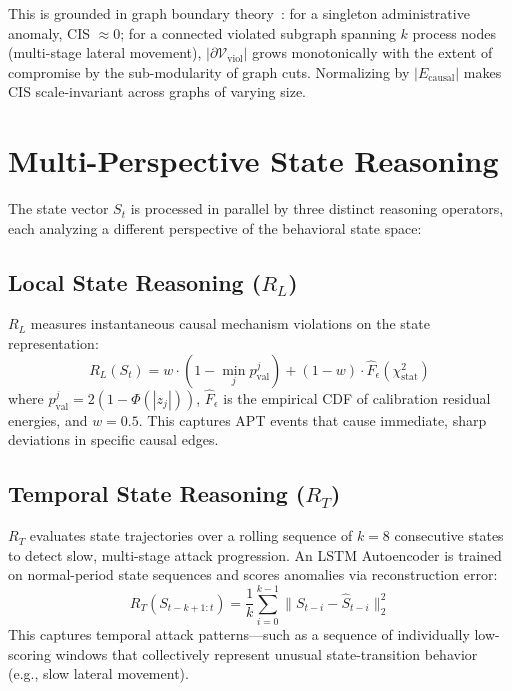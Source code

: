 This is grounded in graph boundary theory~\cite{chung1997spectral}: for a singleton
administrative anomaly, CIS $\approx 0$; for a connected violated subgraph spanning $k$ process
nodes (multi-stage lateral movement), $|\partial\mathcal{V}_{\text{viol}}|$ grows monotonically
with the extent of compromise by the sub-modularity of graph cuts. Normalizing by
$|E_{\text{causal}}|$ makes CIS scale-invariant across graphs of varying size.


\section{Multi-Perspective State Reasoning}
\label{sec:reasoning}

The state vector $S_t$ is processed in parallel by three distinct reasoning operators, each
analyzing a different perspective of the behavioral state space:

\subsection{Local State Reasoning ($R_L$)}
\label{sec:hcas}

$R_L$ measures instantaneous causal mechanism violations on the state representation:
\begin{equation}
R_L(S_t) = w \cdot (1 - \min_j p_{\text{val}}^j) + (1-w) \cdot \hat{F}_{\epsilon}(\chi^2_{\text{stat}})
\end{equation}
where $p_{\text{val}}^j = 2(1 - \Phi(|z_j|))$, $\hat{F}_{\epsilon}$ is the empirical CDF of
calibration residual energies, and $w = 0.5$. This captures APT events that cause immediate,
sharp deviations in specific causal edges.

\subsection{Temporal State Reasoning ($R_T$)}

$R_T$ evaluates state trajectories over a rolling sequence of $k = 8$ consecutive states to
detect slow, multi-stage attack progression. An LSTM Autoencoder is trained on normal-period
state sequences and scores anomalies via reconstruction error:
\begin{equation}
R_T(S_{t-k+1:t}) = \frac{1}{k} \sum_{i=0}^{k-1} \|S_{t-i} - \hat{S}_{t-i}\|_2^2
\end{equation}
This captures temporal attack patterns---such as a sequence of individually low-scoring windows
that collectively represent unusual state-transition behavior (e.g., slow lateral movement).

